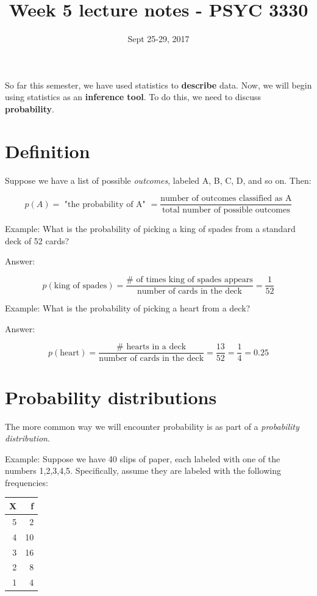 \documentclass[11pt]{article}
\date{Sept 25-29, 2017}
\title{Week 5 lecture notes - PSYC 3330}
\begin{document}
\maketitle
So far this semester, we have used statistics to \textbf{describe} data.  Now, we will begin using statistics as an \textbf{inference tool}.  To do this, we need to discuss \textbf{probability}.

\section*{Definition}
\label{sec-1}

Suppose we have a list of possible \emph{outcomes}, labeled A, B, C, D, and so on.  Then:

\[
p(A) = \text{ "the probability of A" }=\frac{\text{number of outcomes classified as A}}{\text{total number of possible outcomes}}
\]

Example: What is the probability of picking a king of spades from a standard deck of 52 cards?

Answer:

\[
p(\text{king of spades}) = \frac{\text{# of times king of spades appears}}{\text{number of cards in the deck}} = \frac{1}{52}
\]

Example: What is the probability of picking a heart from a deck?

Answer:

\[
p(\text{heart}) = \frac{\text{# hearts in a deck}}{\text{number of cards in the deck}} = \frac{13}{52} =\frac{1}{4} = 0.25
\]

\section*{Probability distributions}
\label{sec-2}

The more common way we will encounter probability is as part of a \emph{probability distribution}.

Example: Suppose we have 40 slips of paper, each labeled with one of the numbers 1,2,3,4,5.  Specifically, assume they are labeled with the following frequencies:

\begin{center}
\begin{tabular}{rr}
X & f\\
\hline
5 & 2\\
4 & 10\\
3 & 16\\
2 & 8\\
1 & 4\\
\end{tabular}
\end{center}
\end{document}
